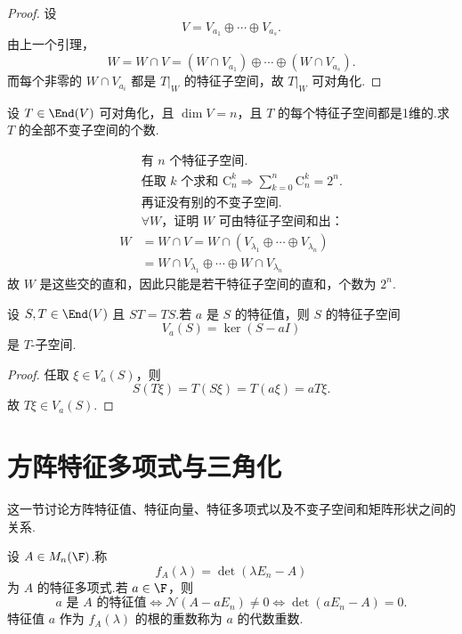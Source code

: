 \begin{proof}
	设
	\[
	V=V_{a_1}\oplus\cdots\oplus V_{a_s}.
	\]
	由上一个引理，
	\[
	W=W\cap V=(W\cap V_{a_1})\oplus\cdots\oplus(W\cap V_{a_s}).
	\]
	而每个非零的 $W\cap V_{a_i}$ 都是 $T|_W$ 的特征子空间，故 $T|_W$ 可对角化.
\end{proof}
\begin{example}
	设 $T \in \End(V)$ 可对角化，且 $\dim V = n$，且 $T$ 的每个特征子空间都是1维的.求 $T$ 的全部不变子空间的个数.
	
	
\end{example}
\begin{solution}
	\begin{align*}
		& \text{有 } n \text{ 个特征子空间}. \\
		& \text{任取 } k \text{ 个求和 } \mathrm{C}_n^k \Rightarrow \sum_{k=0}^n \mathrm{C}_n^k = 2^n. \\
		& \text{再证没有别的不变子空间}. \\
		& \forall W \text{，证明 } W \text{ 可由特征子空间和出：} \\
		W &= W \cap V = W \cap (V_{\lambda_1} \oplus \cdots \oplus V_{\lambda_n}) \\
		&= W \cap V_{\lambda_1} \oplus \cdots \oplus W \cap V_{\lambda_n}
	\end{align*}
	故 $W$ 是这些交的直和，因此只能是若干特征子空间的直和，个数为 $2^n$.
\end{solution}


\begin{example}
	设 $S,T\in\End(V)$ 且 $ST=TS$.若 $a$ 是 $S$ 的特征值，则 $S$ 的特征子空间
	\[
	V_a(S)=\ker(S-aI)
	\]
	是 $T$-子空间.
\end{example}

\begin{proof}
	任取 $\xi\in V_a(S)$，则
	\[
	S(T\xi)=T(S\xi)=T(a\xi)=aT\xi.
	\]
	故 $T\xi\in V_a(S)$.
\end{proof}

\section{方阵特征多项式与三角化}

这一节讨论方阵特征值、特征向量、特征多项式以及不变子空间和矩阵形状之间的关系.

\begin{definition}
	设 $A\in M_n(\F)$.称
	\[
	f_A(\lambda)=\det(\lambda E_n-A)
	\]
	为 $A$ 的特征多项式.若 $a\in\F$，则
	\[
	a\text{ 是 }A\text{ 的特征值}
	\Longleftrightarrow
	\mathcal N(A-aE_n)\neq0
	\Longleftrightarrow
	\det(aE_n-A)=0.
	\]
	特征值 $a$ 作为 $f_A(\lambda)$ 的根的重数称为 $a$ 的代数重数.
\end{definition}

